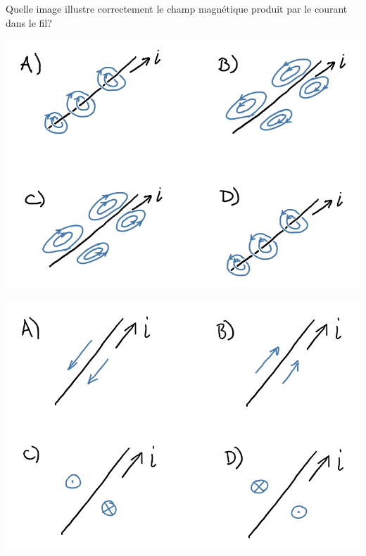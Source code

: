 \begin{diapobox}
  Quelle image illustre correctement le champ magnétique produit par le courant
  dans le fil?

  \begin{center}
    \includegraphics[scale=0.3]{08-champ-magnetique/figures/champ_fil_ex1.png}
  \end{center}

  \begin{center}
    \includegraphics[scale=0.3]{08-champ-magnetique/figures/champ_fil_ex2.png}
  \end{center}
\end{diapobox}

